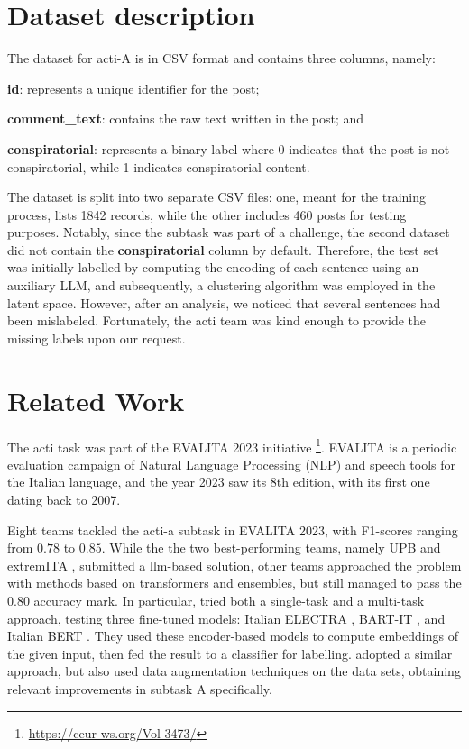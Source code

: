 \documentclass[11pt]{article}
\begin{document}
\section{Dataset description}\label{sec:dataset-description}
The dataset for \ac{acti}-A is in CSV format and contains three columns, namely:
\begin{enumerate*}[label=(\roman*)]
  \item \textbf{id}: represents a unique identifier for the post;
  \item \textbf{comment\_text}: contains the raw text written in the post; and
  \item \textbf{conspiratorial}: represents a binary label where 0 indicates that the post is not conspiratorial,
    while 1 indicates conspiratorial content.
\end{enumerate*}
The dataset is split into two separate CSV files: one, meant for the training process, lists
1842 records, while the other includes 460 posts for testing purposes.
%
Notably, since the subtask was part of a challenge, the second dataset did not contain the
\textbf{conspiratorial} column by default.
%
Therefore, the test set was initially labelled by computing the encoding of each sentence using an auxiliary LLM,
and subsequently, a clustering algorithm was employed in the latent space.
%
However, after an analysis, we noticed that several sentences had been mislabeled.
%
Fortunately, the \ac{acti} team was kind enough to provide the
missing labels upon our request.

\section{Related Work}\label{sec:related-work}

The \ac{acti} task \cite{russo2023actievalita2023overview} was part of the EVALITA 2023 initiative
\cite{lai2023evalita} \footnote{\url{https://ceur-ws.org/Vol-3473/}}. EVALITA is a periodic evaluation campaign
of Natural Language Processing (NLP) and speech tools for the Italian language, and the year 2023 saw its 8th
edition, with its first one dating back to 2007.

Eight teams tackled the \ac{acti}-a subtask in EVALITA 2023, with F1-scores ranging from $0.78$ to $0.85$. While
the the two best-performing teams, namely UPB \cite{paraschiv2023upbactidetecting} and extremITA
\cite{hromei2023extremita}, submitted a \ac{llm}-based solution, other teams approached the problem with methods
based on transformers and ensembles, but still managed to pass the $0.80$ accuracy mark. In particular,
\cite{giobergia2023acti} tried both a single-task and a multi-task approach, testing three fine-tuned models:
Italian ELECTRA \cite{9514855}, BART-IT \cite{fi15010015}, and Italian BERT \cite{stefan-it-italian-bertelectra}.
They used these encoder-based models to compute embeddings of the given input, then fed the result to a classifier
for labelling. \cite{vitali2023acti} adopted a similar approach, but also used data augmentation techniques on the
data sets, obtaining relevant improvements in subtask A specifically.
\end{document}
